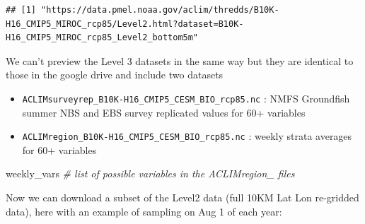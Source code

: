 \documentclass[
]{article}
\newenvironment{Shaded}{\begin{snugshade}}{\end{snugshade}}
\newcommand{\CommentTok}[1]{\textcolor[rgb]{0.56,0.35,0.01}{\textit{#1}}}
\newcommand{\NormalTok}[1]{#1}
\newcommand{\OperatorTok}[1]{\textcolor[rgb]{0.81,0.36,0.00}{\textbf{#1}}}
\newcommand{\StringTok}[1]{\textcolor[rgb]{0.31,0.60,0.02}{#1}}
\providecommand{\tightlist}{%
  \setlength{\itemsep}{0pt}\setlength{\parskip}{0pt}}
\begin{document}
\begin{Shaded}
\end{Shaded}

\begin{verbatim}
## [1] "https://data.pmel.noaa.gov/aclim/thredds/B10K-H16_CMIP5_MIROC_rcp85/Level2.html?dataset=B10K-H16_CMIP5_MIROC_rcp85_Level2_bottom5m"
\end{verbatim}

We can't preview the Level 3 datasets in the same way but they are
identical to those in the google drive and include two datasets

\begin{itemize}
\tightlist
\item
  \texttt{ACLIMsurveyrep\_B10K-H16\_CMIP5\_CESM\_BIO\_rcp85.nc} : NMFS
  Groundfish summer NBS and EBS survey replicated values for 60+
  variables
\item
  \texttt{ACLIMregion\_B10K-H16\_CMIP5\_CESM\_BIO\_rcp85.nc} : weekly
  strata averages for 60+ variables
\end{itemize}

\begin{Shaded}
\begin{Highlighting}[]
\NormalTok{    weekly_vars  }\CommentTok{# list of possible variables in the ACLIMregion_ files }
\end{Highlighting}
\end{Shaded}

Now we can download a subset of the Level2 data (full 10KM Lat Lon
re-gridded data), here with an example of sampling on Aug 1 of each
year:
\end{document}
